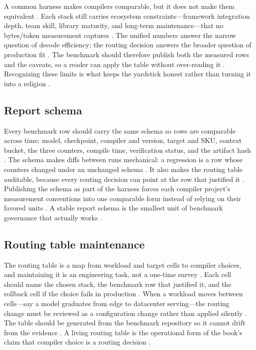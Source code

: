 A common harness makes compilers comparable, but it does not make them equivalent \citep{patel2025llminference,memoryfloor2026}. Each stack still carries ecosystem constraints—framework integration depth, team skill, library maturity, and long-term maintenance—that no bytes/token measurement captures \citep{chen2020compilerbasedhardw,taxbreak2026}. The unified numbers answer the narrow question of decode efficiency; the routing decision answers the broader question of production fit \citep{patel2025llminference,memoryfloor2026}. The benchmark should therefore publish both the measured rows and the caveats, so a reader can apply the table without over-reading it \citep{chen2020compilerbasedhardw,taxbreak2026}. Recognizing these limits is what keeps the yardstick honest rather than turning it into a religion \citep{patel2025llminference,memoryfloor2026}.

\subsection{Report schema}

Every benchmark row should carry the same schema so rows are comparable across time: model, checkpoint, compiler and version, target and SKU, context bucket, the three counters, compile time, verification status, and the artifact hash \citep{patel2025llminference,taxbreak2026,memoryfloor2026}. The schema makes diffs between runs mechanical: a regression is a row whose counters changed under an unchanged schema \citep{chen2020compilerbasedhardw,patel2025llminference}. It also makes the routing table auditable, because every routing decision can point at the row that justified it \citep{memoryfloor2026,taxbreak2026}. Publishing the schema as part of the harness forces each compiler project's measurement conventions into one comparable form instead of relying on their favored units \citep{patel2025llminference,memoryfloor2026}. A stable report schema is the smallest unit of benchmark governance that actually works \citep{chen2020compilerbasedhardw,taxbreak2026}.

\subsection{Routing table maintenance}

The routing table is a map from workload and target cells to compiler choices, and maintaining it is an engineering task, not a one-time survey \citep{yirage2026,patel2025llminference,memoryfloor2026}. Each cell should name the chosen stack, the benchmark row that justified it, and the rollback cell if the choice fails in production \citep{chen2020compilerbasedhardw,taxbreak2026}. When a workload moves between cells—say a model graduates from edge to datacenter serving—the routing change must be reviewed as a configuration change rather than applied silently \citep{patel2025llminference,memoryfloor2026}. The table should be generated from the benchmark repository so it cannot drift from the evidence \citep{chen2020compilerbasedhardw,memoryfloor2026}. A living routing table is the operational form of the book's claim that compiler choice is a routing decision \citep{yirage2026,taxbreak2026}.

